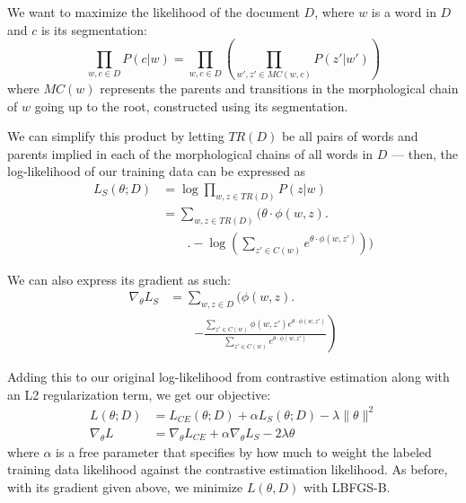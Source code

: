 \documentclass[11pt,twocolumn]{article}
\begin{document}
We want to maximize the likelihood of the document $D$, where $w$ is a word in $D$ and $c$ is
its segmentation:
\begin{equation}
    \prod_{w, c \in D} P(c | w) = \prod_{w, c \in D}\left(\prod_{w', z' \in MC(w, c)} P(z' | w')\right)
\end{equation}
where $MC(w)$ represents the parents and transitions in the morphological chain of $w$ going up to the root,
constructed using its segmentation.

We can simplify this product by letting $TR(D)$ be all pairs of words and parents implied in each of
the morphological chains of all words in $D$ ---
then, the log-likelihood of our training data can be expressed as
\begin{equation}
    \begin{split}
        L_S(\theta; D) &= \log{\prod_{w, z \in TR(D)} P(z|w)} \\
                       &= \sum_{w, z \in TR(D)} \Bigg(\theta \cdot \phi(w, z) \Bigg. \\
                       &\qquad\Bigg. - \log\left(\sum_{z' \in C(w)} e^{\theta \cdot \phi(w, z')} \right)\Bigg)
   \end{split}
\end{equation}

We can also express its gradient as such:
\begin{equation}
    \begin{split}
        \nabla_\theta L_S &= \sum_{w, z \in D} \Bigg(\phi(w, z) \Bigg. \\
                          &\qquad\left. - \frac{\sum_{z' \in C(w)} \phi(w, z') e^{\theta \cdot \phi(w, z')} }{\sum_{z' \in C(w)} e^{\theta \cdot \phi(w, z')}}\right)
    \end{split}
\end{equation}

Adding this to our original log-likelihood from contrastive estimation
along with an L2 regularization term, we get our objective:
\begin{equation}
    \begin{split}
        L(\theta; D) &= L_{CE}(\theta; D) + \alpha L_S(\theta; D) - \lambda \| \theta \|^2 \\
        \nabla_\theta L &= \nabla_\theta L_{CE} + \alpha \nabla_\theta L_S - 2\lambda \theta
    \end{split}
\end{equation}
where $\alpha$ is a free parameter that specifies by how much to weight the labeled training data likelihood
against the contrastive estimation likelihood.
As before, with its gradient given above, we minimize $L(\theta, D)$ with LBFGS-B.
\end{document}
